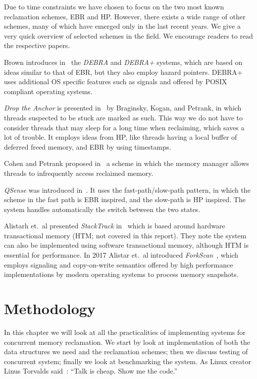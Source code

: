 \documentclass[b5paper]{report}
\begin{document}
Due to time constraints we have chosen to focus on the two most known
reclamation schemes, EBR and HP\@. However, there exists a wide range of other
schemes, many of which have emerged only in the last recent years. We give a
very quick overview of selected schemes in the field. We encourage readers to
read the respective papers.

Brown introduces in~\cite{brown2015reclaiming} the \emph{DEBRA} and \emph{DEBRA+} systems,
which are based on ideas similar to that of EBR\@, but they also employ hazard
pointers. DEBRA+ uses additional OS specific features such as signals and
 offered by POSIX compliant operating systems.

\emph{Drop the Anchor} is presented in~\cite{Braginsky:2013:DAL:2486159.2486184} by
Braginsky, Kogan, and Petrank, in which threads suspected to be stuck are marked
as such. This way we do not have to consider threads that may sleep for a long
time when reclaiming, which saves a lot of trouble. It employs ideas from HP,
like threads having a local buffer of deferred freed memory, and EBR by using
timestamps.

Cohen and Petrank proposed in~\cite{cohen2015efficient} a scheme in which the
memory manager allows threads to infrequently access reclaimed memory.

\emph{QSense} was introduced in~\cite{balmau2016fast}. It uses the
fast-path/slow-path pattern, in which the scheme in the fast path is EBR
inspired, and the slow-path is HP inspired. The system handles automatically the
switch between the two states.

Alistarh et.\ al presented \emph{StackTrack} in~\cite{alistarh2014stacktrack}
which is based around hardware transactional memory (HTM; not covered in this
report). They note the system can also be implemented using software
transactional memory, although HTM is essential for performance. In 2017 Alistar
et.\ al introduced \emph{ForkScan}~\cite{alistarh2017forkscan}, which employs signaling
and copy-on-write semantics offered by high performance implementations by
modern operating systems to process memory snapshots.


\chapter{Methodology\label{ch:methodology}}

In this chapter we will look at all the practicalities of implementing systems
for concurrent memory reclamation. We start by look at implementation of both the
data structures we need and the reclamation schemes; then we discuss testing of
concurrent system; finally we look at benchmarking the system. As Linux creator
Linus Torvalds said~\cite{linus}: ``Talk is cheap. Show me the code.''
\end{document}
